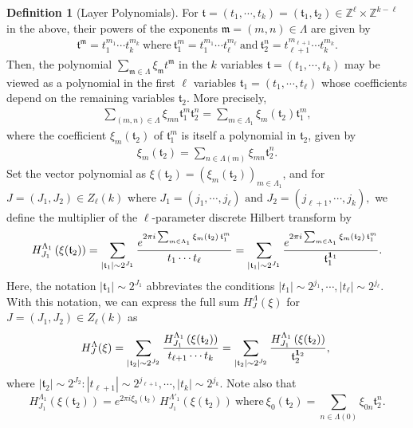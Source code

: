 \documentclass[11 pt,letterpaper]{amsart}
\theoremstyle{plain}
\theoremstyle{definition}
\newtheorem{definition}{Definition}\numberwithin{definition}{section}
\theoremstyle{remark} \theoremstyle{exam} \theoremstyle{ob}
\numberwithin{equation}{section}
\begin{document}
\begin{definition}[Layer Polynomials]
For $\mathfrak{t}=(t_1,\cdots,t_k) = (\mathfrak{t}_1,\mathfrak{t}_2)\in \mathbb{Z}^\ell\times \mathbb{Z}^{k-\ell}$ in the above,  their powers of the exponents $\mathfrak{m}=(m,n)\in \Lambda$ are given by
\begin{align*}
\mathfrak{t}^{\mathfrak{m}}=t_1^{m_1}\cdots t_k^{m_k}\ \text{where}\ \mathfrak{t}_1^m=t_1^{m_1}\cdots t_\ell^{m_\ell}\ \text{and}\  \mathfrak{t}_2^n=t_{\ell+1}^{m_{\ell+1}}\cdots t_k^{m_k}.
\end{align*}
Then,  the polynomial $\sum_{\mathfrak{m}\in \Lambda}\xi_{\mathfrak{m}} t^{\mathfrak{m}}$  in the $k$ variables $\mathfrak{t}=(t_1,\cdots,t_k)$  may be viewed as a polynomial in the first $\ell$ variables $\mathfrak{t}_1=(t_1,\cdots,t_\ell)$ whose coefficients depend  on the remaining variables $\mathfrak{t}_2$. More precisely,
\begin{align*} 
 \sum_{(m,n)\in \Lambda} \xi_{mn} \mathfrak{t}_1^{m}\mathfrak{t}_2^n=\sum_{m\in \Lambda_{1}} \xi_{m}(\mathfrak{t}_2)  \mathfrak{t}_1^{m}, 
\end{align*}
where    the coefficient $ \xi_{m}(\mathfrak{t}_2)$ of \( \mathfrak{t}_1^{m}   \)   is itself a polynomial in $\mathfrak{t}_2$, given by 
\begin{align*}
 \xi_{m}(\mathfrak{t}_2) = \sum_{n\in \Lambda(m)} \xi_{mn}\mathfrak{t}_2^n.
\end{align*}
Set the vector polynomial
 as $\xi(\mathfrak{t}_2)=(\xi_{m}(\mathfrak{t}_2))_{m\in \Lambda_{1}}$, 
and for $J=(J_1,J_2)\in Z_\ell(k)$  where
$\text{$J_1=(j_1,\cdots,j_\ell)$ and $J_2=(j_{\ell+1},\cdots,j_k)$},$
we define the multiplier of the $\ell$-parameter discrete Hilbert transform by
\begin{align*}
H^{\Lambda_{1}}_{J_1}\left( \xi(\mathfrak{t}_2) \right) = \sum_{ |\mathfrak{t}_1| \sim 2^{J_1}} 
\frac{e^{2\pi i \sum_{m \in \Lambda_{1}} \xi_{m}(\mathfrak{t}_2) \, \mathfrak{t}_1^{m} }  }{t_1\cdots t_\ell}= \sum_{|\mathfrak{t}_1|\sim 2^{J_1} } 
\frac{e^{2\pi i \sum_{m \in \Lambda_{1}} \xi_{m}(\mathfrak{t}_2) \, \mathfrak{t}_1^{m} }  }{\mathfrak{t}_1^{{\bf 1}_1} }.
\end{align*}
Here, the notation  $|\mathfrak{t}_1|\sim 2^{J_1}$  abbreviates the conditions $ |t_1| \sim 2^{j_1},\cdots,|t_\ell|\sim 2^{j_{\ell}}$.
With this notation, we can express the full sum \( H^{\Lambda}_{J}(\xi) \) for \(J= (J_1,J_2) \in Z_\ell(k) \) as
\begin{align*}
H^{\Lambda}_J(\xi)=\sum_{| \mathfrak{t}_2 | \sim 2^{J_2}} 
\frac{  H^{\Lambda_{1}}_{J_1}\left( \xi(\mathfrak{t}_2) \right)}{t_{\ell+1}\cdots t_k}= \sum_{|\mathfrak{t}_2|\sim 2^{J_2}} 
\frac{  H^{\Lambda_{1}}_{J_1}\left( \xi(\mathfrak{t}_2) \right)}{\mathfrak{t}_{2}^{{\bf 1}_2}},\  
\end{align*}
where $|\mathfrak{t}_2|\sim 2^{J_2}:|t_{\ell+1}|\sim 2^{j_{\ell+1}},\cdots, |t_k|\sim 2^{j_k}$. Note also that
$$H^{\Lambda_{1}}_{J_1}\left( \xi(\mathfrak{t}_2) \right)=e^{2\pi i \xi_{0}(\mathfrak{t}_2)} \, H^{\Lambda'_{1}}_{J_1}\left( \xi(\mathfrak{t}_2) \right)\ \text{where}\ \xi_{0}(\mathfrak{t}_2) = \sum_{n \in \Lambda(0)} \xi_{0n} \mathfrak{t}_2^n.$$
\end{definition}
\end{document}
